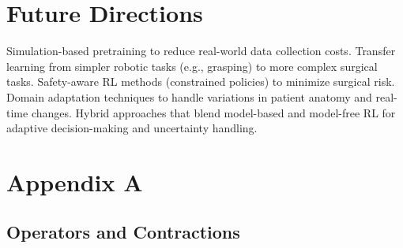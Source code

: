 \documentclass[a4paper,11pt]{report}
\theoremstyle{definition}
\theoremstyle{plain}
\theoremstyle{remark}  %
\begin{document}
\chapter{Future Directions}

Simulation-based pretraining to reduce real-world data collection costs.
Transfer learning from simpler robotic tasks (e.g., grasping) to more complex surgical tasks.
Safety-aware RL methods (constrained policies) to minimize surgical risk.
Domain adaptation techniques to handle variations in patient anatomy and real-time changes.
Hybrid approaches that blend model-based and model-free RL for adaptive decision-making and uncertainty handling.

\printbibliography

% 
% 

\appendix
\chapter{Appendix A}
\section{Operators and Contractions}





\end{document}
